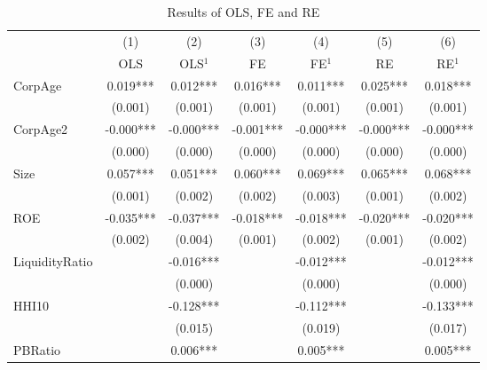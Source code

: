 \begin{table}[htbp]\centering
\def\sym#1{\ifmmode^{#1}\else\(^{#1}\)\fi}
\caption{Results of OLS, FE and RE \label{tab:regression}}
\begin{tabular}{l*{6}{c}}
\hline\hline
            &\multicolumn{1}{c}{(1)}&\multicolumn{1}{c}{(2)}&\multicolumn{1}{c}{(3)}&\multicolumn{1}{c}{(4)}&\multicolumn{1}{c}{(5)}&\multicolumn{1}{c}{(6)}\\
            &\multicolumn{1}{c}{OLS}&\multicolumn{1}{c}{OLS$^{1}$}&\multicolumn{1}{c}{FE}&\multicolumn{1}{c}{FE$^{1}$}&\multicolumn{1}{c}{RE}&\multicolumn{1}{c}{RE$^{1}$}\\
\hline
CorpAge     &       0.019***&       0.012***&       0.016***&       0.011***&       0.025***&       0.018***\\
            &     (0.001)   &     (0.001)   &     (0.001)   &     (0.001)   &     (0.001)   &     (0.001)   \\
[1em]
CorpAge2    &      -0.000***&      -0.000***&      -0.001***&      -0.000***&      -0.000***&      -0.000***\\
            &     (0.000)   &     (0.000)   &     (0.000)   &     (0.000)   &     (0.000)   &     (0.000)   \\
[1em]
Size        &       0.057***&       0.051***&       0.060***&       0.069***&       0.065***&       0.068***\\
            &     (0.001)   &     (0.002)   &     (0.002)   &     (0.003)   &     (0.001)   &     (0.002)   \\
[1em]
ROE         &      -0.035***&      -0.037***&      -0.018***&      -0.018***&      -0.020***&      -0.020***\\
            &     (0.002)   &     (0.004)   &     (0.001)   &     (0.002)   &     (0.001)   &     (0.002)   \\
[1em]
LiquidityRatio&               &      -0.016***&               &      -0.012***&               &      -0.012***\\
            &               &     (0.000)   &               &     (0.000)   &               &     (0.000)   \\
[1em]
HHI10       &               &      -0.128***&               &      -0.112***&               &      -0.133***\\
            &               &     (0.015)   &               &     (0.019)   &               &     (0.017)   \\
[1em]
PBRatio     &               &       0.006***&               &       0.005***&               &       0.005***\\

\end{tabular}
\end{table}
